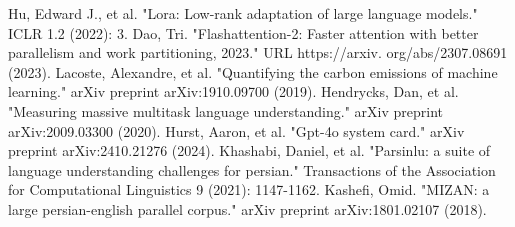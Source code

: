 \documentclass[conference]{IEEEtran}
\begin{document}
\begin{thebibliography}{00}
		Hu, Edward J., et al. "Lora: Low-rank adaptation of large language models." ICLR 1.2 (2022): 3.
		Dao, Tri. "Flashattention-2: Faster attention with better parallelism and work partitioning, 2023." URL https://arxiv. org/abs/2307.08691 (2023).
		Lacoste, Alexandre, et al. "Quantifying the carbon emissions of machine learning." arXiv preprint arXiv:1910.09700 (2019).
		Hendrycks, Dan, et al. "Measuring massive multitask language understanding." arXiv preprint arXiv:2009.03300 (2020).
		Hurst, Aaron, et al. "Gpt-4o system card." arXiv preprint arXiv:2410.21276 (2024).
		Khashabi, Daniel, et al. "Parsinlu: a suite of language understanding challenges for persian." Transactions of the Association for Computational Linguistics 9 (2021): 1147-1162.
		Kashefi, Omid. "MIZAN: a large persian-english parallel corpus." arXiv preprint arXiv:1801.02107 (2018).
	\end{thebibliography}
	
	
\end{document}
